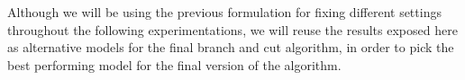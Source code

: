 Although we will be using the previous formulation for fixing different settings throughout the following experimentations, we will reuse the results exposed here as alternative models for the final branch and cut algorithm, in order to pick the best performing model for the final version of the algorithm.

\clearpage